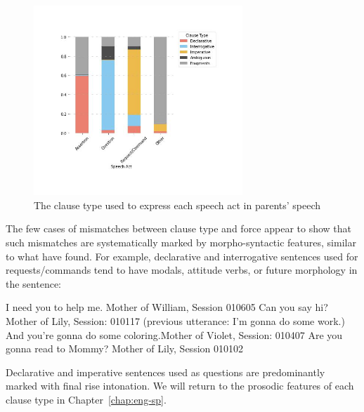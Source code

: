 \begin{figure}[H]
    \centering
    \includegraphics[width=0.7\textwidth]{figures/real-spcl.jpg}
    \caption{The clause type used to express each speech act in parents' speech}
    \label{fig:real-spcl}
\end{figure}


The few cases of mismatches between clause type and force appear to show that such mismatches are systematically marked by morpho-syntactic features, similar to what \textcite{zaitsu2020} have found. For example, declarative and interrogative sentences used for requests/commands tend to have modals, attitude verbs, or future morphology in the sentence:

\bxl{}	I need you to help me.		\hfill	Mother of William, Session 010605
\ex	Can you say hi?				\hfill	Mother of Lily, Session: 010117
\ex	(previous utterance: I'm gonna do some work.)\\
And you’re gonna do some coloring.\hfill		Mother of Violet, Session: 010407
\ex  Are you gonna read to Mommy?	\hfill	Mother of Lily, Session 010102
\exl
\eex 

Declarative and imperative sentences used as questions are predominantly marked with final rise intonation. We will return to the prosodic features of each clause type in Chapter~\ref{chap:eng-sp}.

